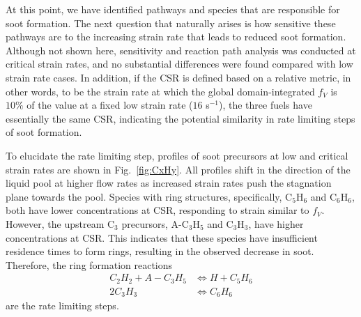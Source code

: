 \documentclass[review,3p,times]{elsarticleUS}
\begin{document}
At this point, we have identified pathways and species that are responsible for soot formation. The next question that naturally arises is how sensitive these pathways are to the increasing strain rate that leads to reduced soot formation. Although not shown here, sensitivity and reaction path analysis was conducted at critical strain rates, and no substantial differences were found compared with low strain rate cases. In addition, if the CSR is defined based on a relative metric, in other words, to be the strain rate at which the global domain-integrated $f_V$ is $10\%$ of the value at a fixed low strain rate ($16$ s$^{-1}$), the three fuels have essentially the same CSR, indicating the potential similarity in rate limiting steps of soot formation.


To elucidate the rate limiting step, profiles of soot precursors at low and critical strain rates are shown in Fig.~\ref{fig:CxHy}. All profiles shift in the direction of the liquid pool at higher flow rates as increased strain rates push the stagnation plane towards the pool. Species with ring structures, specifically, C$_5$H$_6$ and C$_6$H$_6$, both have lower concentrations at CSR, responding to strain similar to $f_V$. However, the upstream C$_3$ precursors, A-C$_3$H$_5$ and C$_3$H$_3$, have higher concentrations at CSR. This indicates that these species have insufficient residence times to form rings, resulting in the observed decrease in soot. Therefore, the ring formation reactions
\begin{align*}
  C_2H_2 + A-C_3H_5 &\Longleftrightarrow H + C_5H_6\\
  2 C_3H_3 &\Longleftrightarrow C_6H_6
\end{align*}
are the rate limiting steps.
\end{document}
